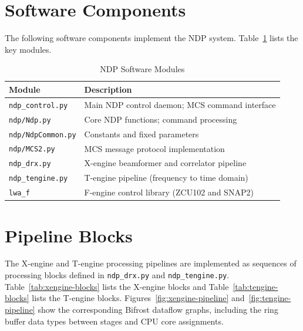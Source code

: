 \section{Software Components}

The following software components implement the NDP system.  Table~\ref{tab:software-modules} lists the key modules.

\begin{table}[htbp]
    \centering
    \caption{NDP Software Modules}
    \label{tab:software-modules}
    \begin{tabular}{lp{8cm}}
        \toprule
        \textbf{Module} & \textbf{Description} \\
        \midrule
        \texttt{ndp\_control.py} & Main NDP control daemon; MCS command interface \\
        \texttt{ndp/Ndp.py} & Core NDP functions; command processing \\
        \texttt{ndp/NdpCommon.py} & Constants and fixed parameters \\
        \texttt{ndp/MCS2.py} & MCS message protocol implementation \\
        \texttt{ndp\_drx.py} & X-engine beamformer and correlator pipeline \\
        \texttt{ndp\_tengine.py} & T-engine pipeline (frequency to time domain) \\
        \texttt{lwa\_f} & F-engine control library (ZCU102 and SNAP2) \\
        \bottomrule
    \end{tabular}
\end{table}

\section{Pipeline Blocks}

The X-engine and T-engine processing pipelines are implemented as sequences of processing blocks defined in \texttt{ndp\_drx.py} and \texttt{ndp\_tengine.py}.  Table~\ref{tab:xengine-blocks} lists the X-engine blocks and Table~\ref{tab:tengine-blocks} lists the T-engine blocks.  Figures~\ref{fig:xengine-pipeline} and~\ref{fig:tengine-pipeline} show the corresponding Bifrost dataflow graphs, including the ring buffer data types between stages and CPU core assignments.

